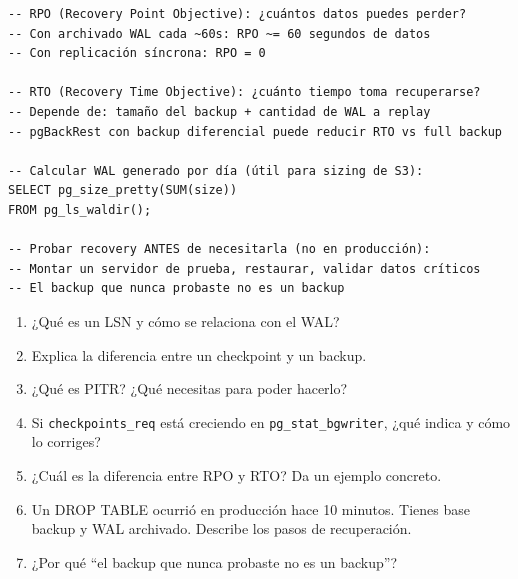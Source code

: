 \begin{lstlisting}[caption={RPO y RTO — métricas de recuperabilidad}]
-- RPO (Recovery Point Objective): ¿cuántos datos puedes perder?
-- Con archivado WAL cada ~60s: RPO ~= 60 segundos de datos
-- Con replicación síncrona: RPO = 0

-- RTO (Recovery Time Objective): ¿cuánto tiempo toma recuperarse?
-- Depende de: tamaño del backup + cantidad de WAL a replay
-- pgBackRest con backup diferencial puede reducir RTO vs full backup

-- Calcular WAL generado por día (útil para sizing de S3):
SELECT pg_size_pretty(SUM(size))
FROM pg_ls_waldir();

-- Probar recovery ANTES de necesitarla (no en producción):
-- Montar un servidor de prueba, restaurar, validar datos críticos
-- El backup que nunca probaste no es un backup
\end{lstlisting}

\begin{entrevistabox}
\begin{enumerate}
  \item ¿Qué es un LSN y cómo se relaciona con el WAL?
  \item Explica la diferencia entre un checkpoint y un backup.
  \item ¿Qué es PITR? ¿Qué necesitas para poder hacerlo?
  \item Si \texttt{checkpoints\_req} está creciendo en \texttt{pg\_stat\_bgwriter}, ¿qué indica y cómo lo corriges?
  \item ¿Cuál es la diferencia entre RPO y RTO? Da un ejemplo concreto.
  \item Un DROP TABLE ocurrió en producción hace 10 minutos. Tienes base backup y WAL archivado. Describe los pasos de recuperación.
  \item ¿Por qué ``el backup que nunca probaste no es un backup''?
\end{enumerate}
\end{entrevistabox}
